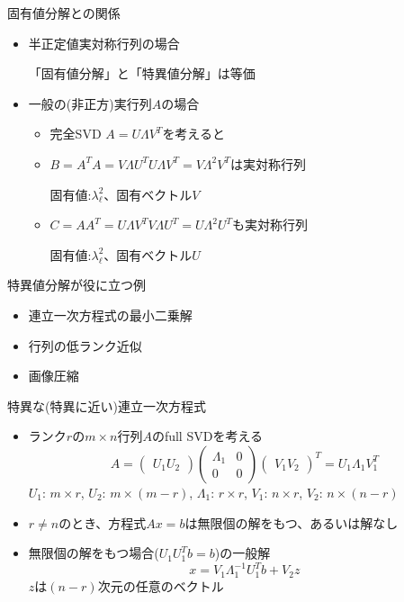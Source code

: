 \begin{frame}[t,fragile]{固有値分解との関係}
  \begin{itemize}
    \setlength{\itemsep}{1em}
  \item 半正定値実対称行列の場合

    「固有値分解」と「特異値分解」は等価
  \item 一般の(非正方)実行列$A$の場合
    \begin{itemize}
      \setlength{\itemsep}{1em}
    \item 完全SVD  $A=U \Lambda V^T$を考えると
    \item $B=A^T A = V \Lambda U^T U \Lambda V^T = V \Lambda^2 V^T$は実対称行列

      固有値:$\lambda_\ell^2$、固有ベクトル$V$
    \item $C=A A^T = U \Lambda V^T V \Lambda U^T = U \Lambda^2 U^T$も実対称行列

      固有値:$\lambda_\ell^2$、固有ベクトル$U$
    \end{itemize}
  \end{itemize}
\end{frame}

\begin{frame}[t,fragile]{特異値分解が役に立つ例}
  \begin{itemize}
    \setlength{\itemsep}{1em}
  \item 連立一次方程式の最小二乗解
  \item 行列の低ランク近似
  \item 画像圧縮
  \end{itemize}
\end{frame}

\begin{frame}[t,fragile]{特異な(特異に近い)連立一次方程式}
  \begin{itemize}
  \item ランク$r$の$m \times n$行列$A$のfull SVDを考える
    \[
    A = \begin{pmatrix} U_1 U_2 \end{pmatrix} \begin{pmatrix} \Lambda_1 & 0 \\ 0 & 0 \end{pmatrix} \begin{pmatrix} V_1 V_2 \end{pmatrix}^T = U_1 \Lambda_1 V_1^T
    \]
    $U_1$: $m \times r$, $U_2$: $m \times (m-r)$, $\Lambda_1$: $r \times r$, $V_1$: $n \times r$, $V_2$: $n \times (n-r)$
  \item $r \ne n$のとき、方程式$Ax=b$は無限個の解をもつ、あるいは解なし
  \item 無限個の解をもつ場合($U_1U_1^Tb=b$)の一般解
    \[
    x = V_1 \Lambda_1^{-1} U_1^T b + V_2 z
    \]
    $z$は$(n-r)$次元の任意のベクトル
  \end{itemize}
\end{frame}

